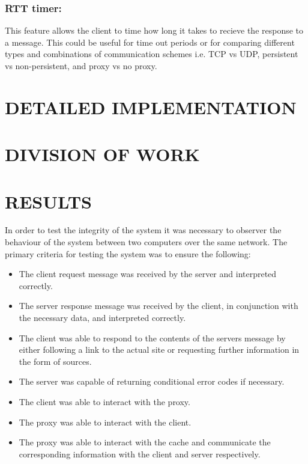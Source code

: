 \documentclass[10pt,twocolumn]{witseiepaper}
\begin{document}
	\subsubsection{RTT timer:}

	This feature allows the client to time how long it takes to recieve the response to a message. This could be useful for time out periods or for comparing different types and combinations of communication schemes i.e. TCP vs UDP, persistent vs non-persistent, and proxy vs no proxy.

\section{DETAILED IMPLEMENTATION}

\section{DIVISION OF WORK}

\section{RESULTS}

	In order to test the integrity of the system it was necessary to observer the behaviour of the system between two computers over the same network. The primary criteria for testing the system was to ensure the following:

	\begin{itemize}
		\item The client request message was received by the server and interpreted correctly.
		\item The server response message was received by the client, in conjunction with the necessary data, and interpreted correctly.
		\item The client was able to respond to the contents of the servers message by either following a link to the actual site or requesting further information in the form of sources.
		\item The server was capable of returning conditional error codes if necessary.
		\item The client was able to interact with the proxy.
		\item The proxy was able to interact with the client.
		\item The proxy was able to interact with the cache and communicate the corresponding information with the client and server respectively.
	\end{itemize}
\end{document}
